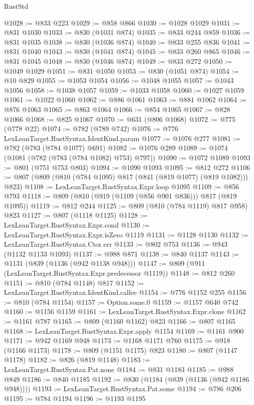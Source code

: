 \begin{lexlean}{RustStd}
\begin{coremodule}
@1028 := @833 @223
@1029 := @858 @866
@1030 := @1028 @1029
@1031 := @831 @1030
@1033 := @830 (@1031 @874)
@1035 := @833 @244 @859
@1036 := @831 @1035
@1038 := @830 (@1036 @874)
@1040 := @833 @255 @836
@1041 := @831 @1040
@1043 := @830 (@1041 @874)
@1045 := @833 @260 @865
@1046 := @831 @1045
@1048 := @830 (@1046 @874)
@1049 := @833 @272
@1050 := @1049 @1029
@1051 := @831 @1050
@1053 := @830 (@1051 @874)
@1054 := @10 @829
@1055 := @1053 @1054
@1056 := @1048 @1055
@1057 := @1043 @1056
@1058 := @1038 @1057
@1059 := @1033 @1058
@1060 := @1027 @1059
@1061 := @1022 @1060
@1062 := @886 @1061
@1063 := @881 @1062
@1064 := @876 @1063
@1065 := @863 @1064
@1066 := @854 @1065
@1067 := @828 @1066
@1068 := @825 @1067
@1070 := @631 (@806 @1068)
@1072 := @775 (@778 @22)
@1074 := @782 (@789 @742)
@1076 := @776 LexLeanTarget.RustSyntax.IdentKind.param
@1077 := @1076 @277
@1081 := @782 (@783 (@784 @1077) @691)
@1082 := @1076 @289
@1089 := @1074 (@1081 (@782 (@783 (@784 @1082) @753) @797))
@1090 := @1072 @1089
@1093 := @801 (@751 @753 @803)
@1094 := @1090 @1093
@1095 := @812 @272
@1106 := @807 (@809 (@810 (@784 @1095) @817 (@841 (@819 @1077) (@819 @1082))) @823)
@1108 := LexLeanTarget.RustSyntax.Expr.loop @1095
@1109 := @856 @793
@1118 := @809 (@810 (@919 (@1109 (@856 @901 @836))) @817 (@819 @1095))
@1119 := @812 @244
@1125 := @809 (@810 (@784 @1119) @817 @958) @823
@1127 := @807 (@1118 @1125)
@1128 := LexLeanTarget.RustSyntax.Expr.cond
@1130 := LexLeanTarget.RustSyntax.Expr.isZero @1119
@1131 := @1128 @1130
@1132 := LexLeanTarget.RustSyntax.Ctor.err
@1133 := @802 @753
@1136 := @943 (@1132 @1133 @1093)
@1137 := @988 @871
@1138 := @840 @1137
@1143 := @1131 (@839 (@1136 (@942 @1138 @948)))
@1147 := @809 (@911 (LexLeanTarget.RustSyntax.Expr.predecessor @1119))
@1148 := @812 @260
@1151 := @810 (@784 @1148) @817
@1152 := LexLeanTarget.RustSyntax.IdentKind.callee
@1154 := @776 @1152 @255
@1156 := @810 (@784 @1154)
@1157 := Option.some.{0}
@1159 := @1157 @640 @742
@1160 := @1156 @1159
@1161 := LexLeanTarget.RustSyntax.Expr.clone
@1162 := @1161 @787
@1165 := @809 (@1160 @1162) @823
@1166 := @807 @1165
@1168 := LexLeanTarget.RustSyntax.Expr.apply @1154
@1169 := @1161 @900
@1171 := @942 @1169 @948
@1173 := @1168 @1171 @760
@1175 := @918 (@1166 @1173)
@1178 := @809 (@1151 @1175) @823
@1180 := @807 (@1147 @1178)
@1182 := @826 (@819 @1148)
@1183 := LexLeanTarget.RustSyntax.Pat.none
@1184 := @831 @1183
@1185 := @988 @849
@1186 := @840 @1185
@1192 := @830 (@1184 (@839 (@1136 (@942 @1186 @948))))
@1193 := LexLeanTarget.RustSyntax.Pat.some
@1194 := @786 @206
@1195 := @784 @1194
@1196 := @1193 @1195

\end{coremodule}
\end{lexlean}
